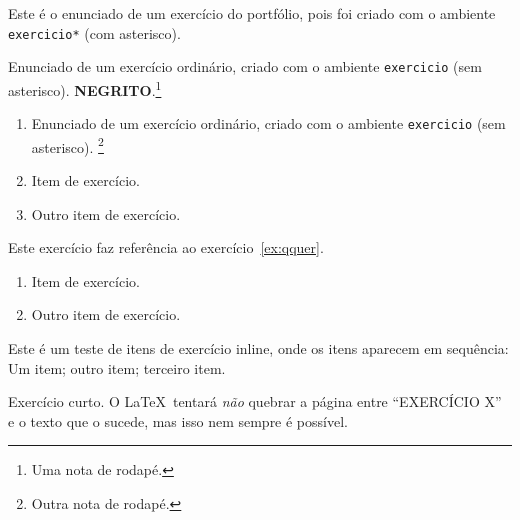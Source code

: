 \documentclass[a4paper]{article}
\begin{document}
\begin{exercicio*}
  Este é o enunciado de um exercício do portfólio, pois foi criado com o ambiente \texttt{exercicio*} (com asterisco).
\end{exercicio*}

\begin{exercicio}
  \label{ex:qquer}%
  Enunciado de um exercício ordinário, criado com o ambiente \texttt{exercicio} (sem asterisco).
  \textbf{\MakeUppercase{Negrito}}.\footnote{Uma nota de rodapé.}
\end{exercicio}

\begin{exercicio}
  \begin{enumerate}
  \item Enunciado de um exercício ordinário, criado com o ambiente \texttt{exercicio} (sem asterisco).
  \footnote{Outra nota de rodapé.}
  \item Item de exercício.
  \item Outro item de exercício.
  \end{enumerate}
\end{exercicio}

\begin{exercicio}
  Este exercício faz referência ao exercício~\ref{ex:qquer}.
\end{exercicio}

\begin{exercicio}
  \begin{enumerate}
  \item Item de exercício.
  \item Outro item de exercício.
  \end{enumerate}
  
  \begin{inlineenum}
    Este é um teste de itens de exercício inline, onde os itens aparecem em sequência:
    \inlineitem Um item;
    \inlineitem outro item;
    \inlineitem terceiro item.
  \end{inlineenum}

\end{exercicio}

\begin{exercicio}
  \lipsum[1-20]
\end{exercicio}

\begin{exercicio}
  Exercício curto.
  O \LaTeX\ tentará \emph{não} quebrar a página entre ``EXERCÍCIO X'' e o texto que o sucede, mas isso nem sempre é possível.
\end{exercicio}
\end{document}

